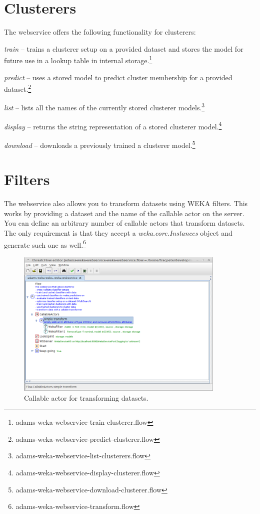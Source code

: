 \documentclass[a4paper]{book}
\begin{document}
\section{Clusterers}
The webservice offers the following functionality for clusterers:
\begin{tight_itemize}
	\item \textit{train} -- trains a clusterer setup on a provided dataset 
	and stores the model for future use in a lookup table in internal
	storage.\footnote{adams-weka-webservice-train-clusterer.flow}
	\item \textit{predict} -- uses a stored model to predict cluster membership
	for	a provided dataset.\footnote{adams-weka-webservice-predict-clusterer.flow}
	\item \textit{list} -- lists all the names of the currently stored clusterer
	models.\footnote{adams-weka-webservice-list-clusterers.flow}
	\item \textit{display} -- returns the string representation of a stored
	clusterer model.\footnote{adams-weka-webservice-display-clusterer.flow}
	\item \textit{download} -- downloads a previously trained a clusterer 
	model.\footnote{adams-weka-webservice-download-clusterer.flow}
\end{tight_itemize}

\section{Filters}
The webservice also allows you to transform datasets using WEKA filters. This
works by providing a dataset and the name of the callable actor on the server.
You can define an arbitrary number of callable actors that transform datasets.
The only requirement is that they accept a \textit{weka.core.Instances} object
and generate such one as well.\footnote{adams-weka-webservice-transform.flow}

\begin{figure}[htb]
  \centering
  \includegraphics[width=10.0cm]{images/transform_callable_actor.png}
  \caption{Callable actor for transforming datasets.}
  \label{transform_callable_actor}
\end{figure}
\end{document}
